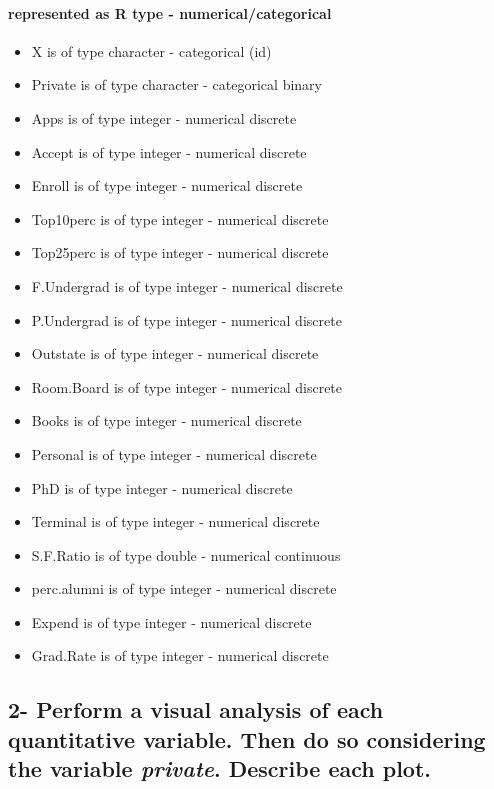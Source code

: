 \documentclass[]{article}
\providecommand{\tightlist}{%
  \setlength{\itemsep}{0pt}\setlength{\parskip}{0pt}}
\let\oldparagraph\paragraph
\renewcommand{\paragraph}[1]{\oldparagraph{#1}\mbox{}}
\begin{document}
\hypertarget{represented-as-r-type---numericalcategorical}{%
\paragraph{represented as R type -
numerical/categorical}\label{represented-as-r-type---numericalcategorical}}

\begin{itemize}
\tightlist
\item
  X is of type character - categorical (id)
\item
  Private is of type character - categorical binary
\item
  Apps is of type integer - numerical discrete
\item
  Accept is of type integer - numerical discrete
\item
  Enroll is of type integer - numerical discrete
\item
  Top10perc is of type integer - numerical discrete
\item
  Top25perc is of type integer - numerical discrete
\item
  F.Undergrad is of type integer - numerical discrete
\item
  P.Undergrad is of type integer - numerical discrete
\item
  Outstate is of type integer - numerical discrete
\item
  Room.Board is of type integer - numerical discrete
\item
  Books is of type integer - numerical discrete
\item
  Personal is of type integer - numerical discrete
\item
  PhD is of type integer - numerical discrete
\item
  Terminal is of type integer - numerical discrete
\item
  S.F.Ratio is of type double - numerical continuous
\item
  perc.alumni is of type integer - numerical discrete
\item
  Expend is of type integer - numerical discrete
\item
  Grad.Rate is of type integer - numerical discrete
\end{itemize}

\hypertarget{perform-a-visual-analysis-of-each-quantitative-variable.-then-do-so-considering-the-variable-private.-describe-each-plot.}{%
\subsection{\texorpdfstring{2- Perform a visual analysis of each
quantitative variable. Then do so considering the variable
\emph{private}. Describe each
plot.}{2- Perform a visual analysis of each quantitative variable. Then do so considering the variable private. Describe each plot.}}\label{perform-a-visual-analysis-of-each-quantitative-variable.-then-do-so-considering-the-variable-private.-describe-each-plot.}}
\end{document}

